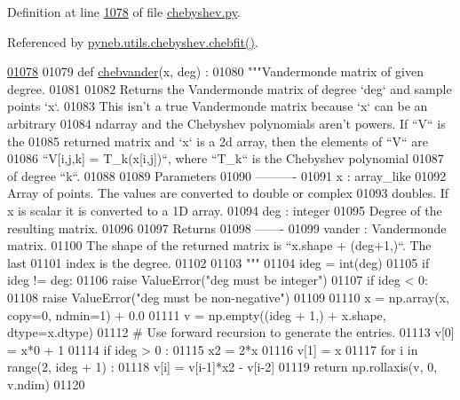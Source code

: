Definition at line \hyperlink{chebyshev_8py_source_l01078}{1078} of file \hyperlink{chebyshev_8py_source}{chebyshev.\-py}.



Referenced by \hyperlink{chebyshev_8py_source_l01121}{pyneb.\-utils.\-chebyshev.\-chebfit()}.


\begin{DoxyCode}
\hypertarget{namespacepyneb_1_1utils_1_1chebyshev_l01078}{}\hyperlink{namespacepyneb_1_1utils_1_1chebyshev_a4a53ad781fcf149c5ab6ae5d021b0950}{01078} 
01079 \textcolor{keyword}{def }\hyperlink{namespacepyneb_1_1utils_1_1chebyshev_a4a53ad781fcf149c5ab6ae5d021b0950}{chebvander}(x, deg) :
01080     \textcolor{stringliteral}{"""Vandermonde matrix of given degree.}
01081 \textcolor{stringliteral}{}
01082 \textcolor{stringliteral}{    Returns the Vandermonde matrix of degree `deg` and sample points `x`.}
01083 \textcolor{stringliteral}{    This isn't a true Vandermonde matrix because `x` can be an arbitrary}
01084 \textcolor{stringliteral}{    ndarray and the Chebyshev polynomials aren't powers. If ``V`` is the}
01085 \textcolor{stringliteral}{    returned matrix and `x` is a 2d array, then the elements of ``V`` are}
01086 \textcolor{stringliteral}{    ``V[i,j,k] = T\_k(x[i,j])``, where ``T\_k`` is the Chebyshev polynomial}
01087 \textcolor{stringliteral}{    of degree ``k``.}
01088 \textcolor{stringliteral}{}
01089 \textcolor{stringliteral}{    Parameters}
01090 \textcolor{stringliteral}{    ----------}
01091 \textcolor{stringliteral}{    x : array\_like}
01092 \textcolor{stringliteral}{        Array of points. The values are converted to double or complex}
01093 \textcolor{stringliteral}{        doubles. If x is scalar it is converted to a 1D array.}
01094 \textcolor{stringliteral}{    deg : integer}
01095 \textcolor{stringliteral}{        Degree of the resulting matrix.}
01096 \textcolor{stringliteral}{}
01097 \textcolor{stringliteral}{    Returns}
01098 \textcolor{stringliteral}{    -------}
01099 \textcolor{stringliteral}{    vander : Vandermonde matrix.}
01100 \textcolor{stringliteral}{        The shape of the returned matrix is ``x.shape + (deg+1,)``. The last}
01101 \textcolor{stringliteral}{        index is the degree.}
01102 \textcolor{stringliteral}{}
01103 \textcolor{stringliteral}{    """}
01104     ideg = int(deg)
01105     \textcolor{keywordflow}{if} ideg != deg:
01106         \textcolor{keywordflow}{raise} ValueError(\textcolor{stringliteral}{"deg must be integer"})
01107     \textcolor{keywordflow}{if} ideg < 0:
01108         \textcolor{keywordflow}{raise} ValueError(\textcolor{stringliteral}{"deg must be non-negative"})
01109 
01110     x = np.array(x, copy=0, ndmin=1) + 0.0
01111     v = np.empty((ideg + 1,) + x.shape, dtype=x.dtype)
01112     \textcolor{comment}{# Use forward recursion to generate the entries.}
01113     v[0] = x*0 + 1
01114     \textcolor{keywordflow}{if} ideg > 0 :
01115         x2 = 2*x
01116         v[1] = x
01117         \textcolor{keywordflow}{for} i \textcolor{keywordflow}{in} range(2, ideg + 1) :
01118             v[i] = v[i-1]*x2 - v[i-2]
01119     \textcolor{keywordflow}{return} np.rollaxis(v, 0, v.ndim)
01120 

\end{DoxyCode}
